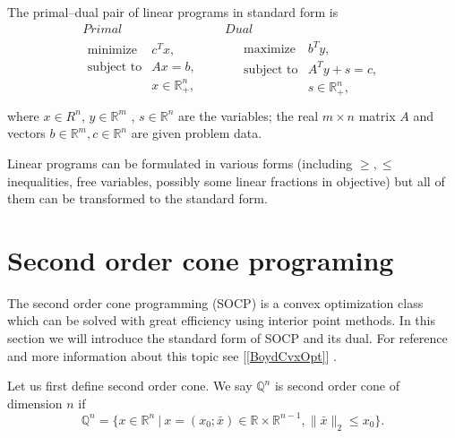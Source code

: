 \documentclass[12pt]{book}
\theoremstyle{definition}
\begin{document}
\label{defLP}
The primal--dual pair of linear programs in standard form is 
\begin{equation}
\label{LP} 
\begin{array}{cc}
Primal & Dual \\
\begin{array}{ll}
\mbox{minimize} & c^Tx, \\
\mbox{subject to}& Ax = b ,  \\
& x \in \mathbb{R}^n_+,\\

\end{array} 
\ \ \ \ \ & \ \ \ \ \ 
\begin{array}{ll}
\mbox{maximize} & b^Ty, \\
\mbox{subject to}& A^Ty +s = c ,  \\
& s\in \mathbb{R}^n_+, \\
\end{array}
\end{array} 
\end{equation}
where $x\in R^n$, $y\in \mathbb{R}^m$ , $s\in \mathbb{R}^n$ are the variables; the real $m\times n$ matrix $A$ and vectors $b \in \mathbb{R}^m, c\in \mathbb{R}^n$ are given problem data.

\bigskip

\rem Linear programs can be formulated in various forms (including $\geq , \leq$ inequalities, free variables, possibly some linear fractions in objective) but all of them can be transformed to the standard form.
%


\section{Second order cone programing}
\label{SectionSOCP}


The second order cone programming (SOCP) is a convex optimization class which can be solved with great efficiency using interior point methods. 
In this section we will introduce the standard form of SOCP and its dual. For reference and more information about this topic see [\ref{BoydCvxOpt}] .


Let us first define second order cone.
\label{defSOC} We say $\mathbb{Q}^n$ is second order cone of dimension $n$ if 
\begin{equation}
\mathbb{Q}^n=\{x\in \mathbb{R}^n \ | \ x = (x_0;\bar{x}) \in \mathbb{R}\times\mathbb{R}^{n-1}, \|\bar{x}\|_2\leq x_0\}.
\end{equation}
\end{document}
